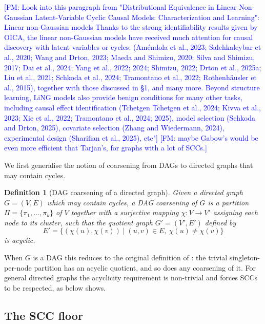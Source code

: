 \documentclass{article}
\newtheorem{definition}{Definition}
\newcommand{\fransays}[1]{\textcolor{blue}{[FM: #1]}}
\begin{document}
\fransays{Look into this paragraph from "Distributional Equivalence in Linear Non-Gaussian Latent-Variable Cyclic Causal Models: Characterization and Learning":
Linear non-Gaussian models Thanks to the strong identifiability results given by OICA, the linear
non-Gaussian models have received much attention for causal discovery with latent variables or cycles:
(Améndola et al., 2023; Salehkaleybar et al., 2020; Wang and Drton, 2023; Maeda and Shimizu, 2020;
Silva and Shimizu, 2017; Dai et al., 2024; Yang et al., 2022; 2024; Shimizu, 2022; Drton et al., 2025a;
Liu et al., 2021; Schkoda et al., 2024; Tramontano et al., 2022; Rothenhäusler et al., 2015), together
with those discussed in §1, and many more. Beyond structure learning, LiNG models also provide
benign conditions for many other tasks, including causal effect identification (Tchetgen Tchetgen et al.,
2024; Kivva et al., 2023; Xie et al., 2022; Tramontano et al., 2024; 2025), model selection (Schkoda
and Drton, 2025), covariate selection (Zhang and Wiedermann, 2024), experimental design (Sharifian et al., 2025), etc"}
\fransays{maybe Gabow's would be even more efficient that Tarjan's, for graphs with a lot of SCCs.}

We first generalise the notion of coarsening from DAGs to directed graphs that may contain cycles.

\begin{definition}[DAG coarsening of a directed graph]\label{def:dag-coarsening}
    Given a directed graph $G = (V, E)$ which may contain cycles, a \emph{DAG coarsening} of $G$ is a partition $\Pi = \{\pi_1, \ldots, \pi_k\}$ of $V$ together with a surjective mapping $\chi : V \to V'$ assigning each node to its cluster, such that the quotient graph $G' = (V', E')$ defined by
    \[
        E' = \{(\chi(u), \chi(v)) \mid (u, v) \in E,\ \chi(u) \neq \chi(v)\}
    \]
    is acyclic.
\end{definition}

When $G$ is a DAG this reduces to the original definition of \citet{madaleno2026coarsening}: the trivial singleton-per-node partition has an acyclic quotient, and so does any coarsening of it. For general directed graphs the acyclicity requirement is non-trivial and forces SCCs to be respected, as  below shows.

\subsection{The SCC floor}
\label{sec:scc-floor}
\end{document}
